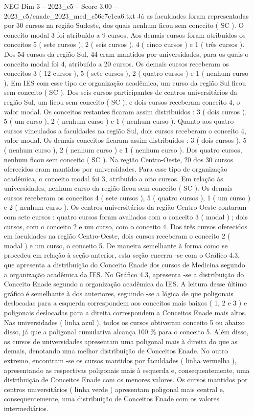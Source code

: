 \begin{textsample}{NEG Dim 3 – 2023\_c5 – Score 3.00 – 2023\_c5/enade\_2023\_med\_c56e7c1ea6.txt}
Já as faculdades foram representadas por 30 cursos na região Sudeste, dos quais nenhum ficou sem conceito ( SC ).
O conceito modal 3 foi atribuído a 9 cursos.
Aos demais cursos foram atribuídos os conceitos 5 ( sete cursos ), 2 ( seis cursos ), 4 ( cinco cursos ) e 1 ( três cursos ).
Dos 54 cursos da região Sul, 44 eram mantidos por universidades, para os quais o conceito modal foi 4, atribuído a 20 cursos.
Os demais cursos receberam os conceitos 3 ( 12 cursos ), 5 ( sete cursos ), 2 ( quatro cursos ) e 1 ( nenhum curso ).
Em IES com esse tipo de organização acadêmica, um curso da região Sul ficou sem conceito ( SC ).
Dos seis cursos participantes de centros universitários da região Sul, um ficou sem conceito ( SC ), e dois cursos receberam conceito 4, o valor modal.
Os conceitos restantes ficaram assim distribuídos : 3 ( dois cursos ), 5 ( um curso ), 2 ( nenhum curso ) e 1 ( nenhum curso ).
Quanto aos quatro cursos vinculados a faculdades na região Sul, dois cursos receberam o conceito 4, valor modal.
Os demais conceitos ficaram assim distribuídos : 3 ( dois cursos ), 5 ( nenhum curso ), 2 ( nenhum curso ) e 1 ( nenhum curso ).
Dos quatro cursos, nenhum ficou sem conceito ( SC ).
Na região Centro-Oeste, 20 dos 30 cursos oferecidos eram mantidos por universidades.
Para esse tipo de organização acadêmica, o conceito modal foi 3, atribuído a oito cursos.
Em relação às universidades, nenhum curso da região ficou sem conceito ( SC ).
Os demais cursos receberam os conceitos 4 ( sete cursos ), 5 ( quatro cursos ), 1 ( um curso ) e 2 ( nenhum curso ).
Os centros universitários da região Centro-Oeste contaram com sete cursos : quatro cursos foram avaliados com o conceito 3 ( modal ) ; dois cursos, com o conceito 2 e um curso, com o conceito 4.
Dos três cursos oferecidos em faculdades na região Centro-Oeste, dois cursos receberam o conceito 2 ( modal ) e um curso, o conceito 5.
De maneira semelhante à forma como se procedeu em relação à seção anterior, esta seção encerra -se com o Gráfico 4.3, que apresenta a distribuição do Conceito Enade dos cursos de Medicina segundo a organização acadêmica da IES.
No Gráfico 4.3, apresenta -se a distribuição do Conceito Enade segundo a organização acadêmica da IES.
A leitura desse último gráfico é semelhante à dos anteriores, seguindo -se a lógica de que poligonais deslocadas para a esquerda correspondem aos conceitos mais baixos ( 1, 2 e 3 ) e poligonais deslocadas para a direita correspondem a Conceitos Enade mais altos.
Nas universidades ( linha azul ), todos os cursos obtiveram conceito 5 ou abaixo disso, já que a poligonal cumulativa alcança 100 \% para o conceito 5.
Além disso, os cursos de universidades apresentam uma poligonal mais à direita do que as demais, denotando uma melhor distribuição de Conceitos Enade.
No outro extremo, encontram -se os cursos mantidos por faculdades ( linha vermelha ), apresentando as respectivas poligonais mais à esquerda e, consequentemente, uma distribuição de Conceitos Enade com os menores valores.
Os cursos mantidos por centros universitários ( linha verde ) apresentam poligonal mais central e, consequentemente, uma distribuição de Conceitos Enade com os valores intermediários.

\end{textsample}
